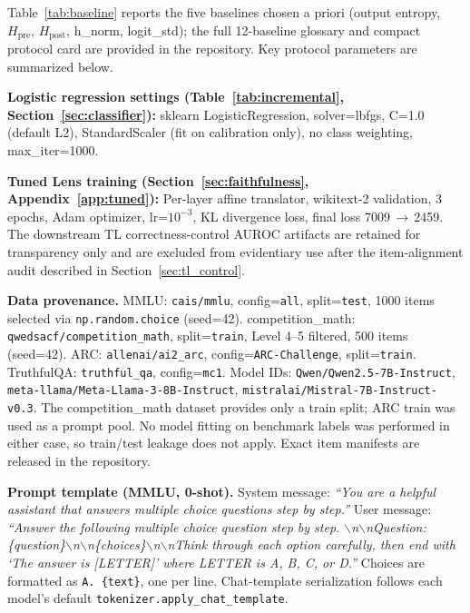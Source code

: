 \documentclass{ieeeaccess}
\newcommand{\Hpre}{H_{\text{pre}}}
\newcommand{\Hpost}{H_{\text{post}}}
\begin{document}
Table~\ref{tab:baseline} reports the five baselines chosen a priori (output entropy, $\Hpre$, $\Hpost$, h\_norm, logit\_std); the full 12-baseline glossary and compact protocol card are provided in the repository. Key protocol parameters are summarized below.

{\sloppy
\textbf{Logistic regression settings (Table~\ref{tab:incremental}, Section~\ref{sec:classifier}):} sklearn LogisticRegression, solver=lbfgs, C=1.0 (default L2), StandardScaler (fit on calibration only), no class weighting, max\_iter=1000.

\textbf{Tuned Lens training (Section~\ref{sec:faithfulness}, Appendix~\ref{app:tuned}):} Per-layer affine translator, wikitext-2 validation, 3 epochs, Adam optimizer, lr=$10^{-3}$, KL divergence loss, final loss \mbox{7009\,$\to$\,2459}. The downstream TL correctness-control AUROC artifacts are retained for transparency only and are excluded from evidentiary use after the item-alignment audit described in Section~\ref{sec:tl_control}.

\textbf{Data provenance.} MMLU: \texttt{cais/\allowbreak mmlu}, config=\texttt{all}, split=\texttt{test}, 1000 items selected via \texttt{np.random.choice} (seed=42). competition\_math: \texttt{qwedsacf/\allowbreak competition\_math}, split=\texttt{train}, Level 4--5 filtered, 500 items (seed=42). ARC: \texttt{allenai/\allowbreak ai2\_arc}, config=\texttt{ARC-\allowbreak Challenge}, split=\texttt{train}. TruthfulQA: \texttt{truthful\_qa}, config=\texttt{mc1}. Model IDs: \texttt{Qwen/\allowbreak Qwen2.5-7B-Instruct}, \texttt{meta-llama/\allowbreak Meta-Llama-3-8B-Instruct}, \texttt{mistralai/\allowbreak Mistral-7B-Instruct-v0.3}. The competition\_math dataset provides only a train split; ARC train was used as a prompt pool. No model fitting on benchmark labels was performed in either case, so train/test leakage does not apply. Exact item manifests are released in the repository.

\textbf{Prompt template (MMLU, 0-shot).} System message: \textit{``You are a helpful assistant that answers multiple choice questions step by step.''} User message: \textit{``Answer the following multiple choice question step by step. $\backslash$n$\backslash$nQuestion: \{question\}$\backslash$n$\backslash$n\{choices\}$\backslash$n$\backslash$nThink through each option carefully, then end with `The answer is [LETTER]' where LETTER is A, B, C, or D.''} Choices are formatted as \texttt{A. \{text\}}, one per line. Chat-template serialization follows each model's default \texttt{tokenizer.apply\_chat\_template}.

}
\end{document}
